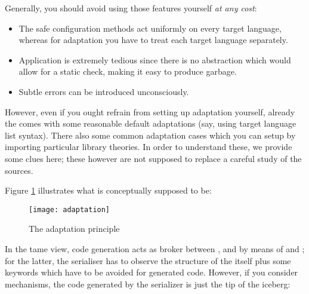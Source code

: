 \begin{isabellebody}
\begin{isamarkuptext}
  \noindent Generally, you should avoid using those features yourself
  \emph{at any cost}:

  \begin{itemize}

    \item The safe configuration methods act uniformly on every target
      language, whereas for adaptation you have to treat each target
      language separately.

    \item Application is extremely tedious since there is no
      abstraction which would allow for a static check, making it easy
      to produce garbage.

    \item Subtle errors can be introduced unconsciously.

  \end{itemize}

  \noindent However, even if you ought refrain from setting up
  adaptation yourself, already the  comes with some
  reasonable default adaptations (say, using target language list
  syntax).  There also some common adaptation cases which you can
  setup by importing particular library theories.  In order to
  understand these, we provide some clues here; these however are not
  supposed to replace a careful study of the sources.%
\end{isamarkuptext}%
\isamarkuptrue%
%
\isamarkuptrue%
%
\begin{isamarkuptext}%
Figure \ref{fig:adaptation} illustrates what  is
  conceptually supposed to be:

  \begin{figure}[here]
    \texttt{[image: adaptation]}
    \caption{The adaptation principle}
    \label{fig:adaptation}
  \end{figure}

  \noindent In the tame view, code generation acts as broker between
  ,  and  by means of  and ; for the latter, the serialiser has to observe the
  structure of the  itself plus some 
  keywords which have to be avoided for generated code.  However, if
  you consider  mechanisms, the code generated by
  the serializer is just the tip of the iceberg:

  \begin{itemize}


\end{itemize}
\end{isamarkuptext}
\end{isabellebody}

